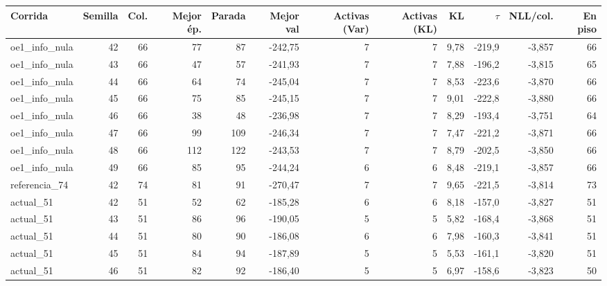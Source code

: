\begin{tabular}{@{}lrrrrrrrrrrr@{}}
\toprule
Corrida & Semilla & Col. & Mejor ép. & Parada & Mejor val & Activas (Var) & Activas (KL) & KL & $\tau$ & NLL/col. & En piso \\
\midrule
oe1\_info\_nula & 42 & 66 & 77 & 87 & -242{,}75 & 7 & 7 & 9{,}78 & -219{,}9 & -3{,}857 & 66 \\
oe1\_info\_nula & 43 & 66 & 47 & 57 & -241{,}93 & 7 & 7 & 7{,}88 & -196{,}2 & -3{,}815 & 65 \\
oe1\_info\_nula & 44 & 66 & 64 & 74 & -245{,}04 & 7 & 7 & 8{,}53 & -223{,}6 & -3{,}870 & 66 \\
oe1\_info\_nula & 45 & 66 & 75 & 85 & -245{,}15 & 7 & 7 & 9{,}01 & -222{,}8 & -3{,}880 & 66 \\
oe1\_info\_nula & 46 & 66 & 38 & 48 & -236{,}98 & 7 & 7 & 8{,}29 & -193{,}4 & -3{,}751 & 64 \\
oe1\_info\_nula & 47 & 66 & 99 & 109 & -246{,}34 & 7 & 7 & 7{,}47 & -221{,}2 & -3{,}871 & 66 \\
oe1\_info\_nula & 48 & 66 & 112 & 122 & -243{,}53 & 7 & 7 & 8{,}79 & -202{,}5 & -3{,}850 & 66 \\
oe1\_info\_nula & 49 & 66 & 85 & 95 & -244{,}24 & 6 & 6 & 8{,}48 & -219{,}1 & -3{,}857 & 66 \\
referencia\_74 & 42 & 74 & 81 & 91 & -270{,}47 & 7 & 7 & 9{,}65 & -221{,}5 & -3{,}814 & 73 \\
actual\_51 & 42 & 51 & 52 & 62 & -185{,}28 & 6 & 6 & 8{,}18 & -157{,}0 & -3{,}827 & 51 \\
actual\_51 & 43 & 51 & 86 & 96 & -190{,}05 & 5 & 5 & 5{,}82 & -168{,}4 & -3{,}868 & 51 \\
actual\_51 & 44 & 51 & 80 & 90 & -186{,}08 & 6 & 6 & 7{,}98 & -160{,}3 & -3{,}841 & 51 \\
actual\_51 & 45 & 51 & 84 & 94 & -187{,}89 & 5 & 5 & 5{,}53 & -161{,}1 & -3{,}820 & 51 \\
actual\_51 & 46 & 51 & 82 & 92 & -186{,}40 & 5 & 5 & 6{,}97 & -158{,}6 & -3{,}823 & 50 \\
\bottomrule
\end{tabular}
